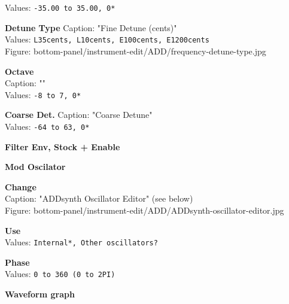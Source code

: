 \documentclass[
 11pt,
 twoside,
 a4paper,
 headinclude,
 footinclude,
 final                                 %
]{article}
\begin{document}
\begin{enumber}
\begin{enumber}
\begin{enumber}
\begin{enumber}
\begin{enumber}
\begin{enumber}
                           Values: \texttt{-35.00 to 35.00, 0*} \\
                        \item \textbf{Detune Type}
                           Caption: "Fine Detune (cents)" \\
                           Values: \texttt{L35cents, L10cents, E100cents, E1200cents} \\
                           Figure: bottom-panel/instrument-edit/ADD/frequency-detune-type.jpg
                        \item \textbf{Octave} \\
                           Caption: "" \\
                           Values: \texttt{-8 to 7, 0*}
                        \item \textbf{Coarse Det.}
                           Caption: "Coarse Detune" \\
                           Values: \texttt{-64 to 63, 0*}
                        \item \textbf{Filter Env, Stock + Enable}
                     \end{enumber}
                  \item \textbf{Mod Oscilator}
                     \begin{enumber}
                        \item \textbf{Change} \\
                           Caption: "ADDsynth Oscillator Editor" (see below)\\
                           Figure: bottom-panel/instrument-edit/ADD/ADDsynth-oscillator-editor.jpg

                        \item \textbf{Use} \\
                           Values: \texttt{Internal*, Other oscillators?}
                        \item \textbf{Phase} \\
                           Values: \texttt{0 to 360 (0 to 2PI)}
                        \item \textbf{Waveform graph}
                     \end{enumber}

               \end{enumber}



\end{enumber}
\end{enumber}
\end{enumber}
\end{enumber}
\end{document}
